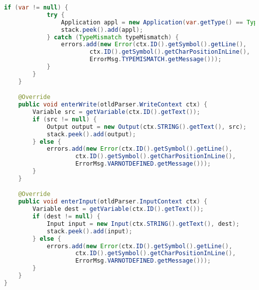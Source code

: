 \begin{landscape}
\begin{lstlisting}[language=Java]
        if (var != null) {
            try {
                Application appl = new Application(var.getType() == Type.BOOL ? Operator.NOT : Operator.UMINUS, var, var);
                stack.peek().add(appl);
            } catch (TypeMismatch typeMismatch) {
                errors.add(new Error(ctx.ID().getSymbol().getLine(),
                        ctx.ID().getSymbol().getCharPositionInLine(),
                        ErrorMsg.TYPEMISMATCH.getMessage()));
            }
        }
    }

    @Override
    public void enterWrite(otldParser.WriteContext ctx) {
        Variable src = getVariable(ctx.ID().getText());
        if (src != null) {
            Output output = new Output(ctx.STRING().getText(), src);
            stack.peek().add(output);
        } else {
            errors.add(new Error(ctx.ID().getSymbol().getLine(),
                    ctx.ID().getSymbol().getCharPositionInLine(),
                    ErrorMsg.VARNOTDEFINED.getMessage()));
        }
    }

    @Override
    public void enterInput(otldParser.InputContext ctx) {
        Variable dest = getVariable(ctx.ID().getText());
        if (dest != null) {
            Input input = new Input(ctx.STRING().getText(), dest);
            stack.peek().add(input);
        } else {
            errors.add(new Error(ctx.ID().getSymbol().getLine(),
                    ctx.ID().getSymbol().getCharPositionInLine(),
                    ErrorMsg.VARNOTDEFINED.getMessage()));
        }
    }
}
\end{lstlisting}
\end{landscape}

